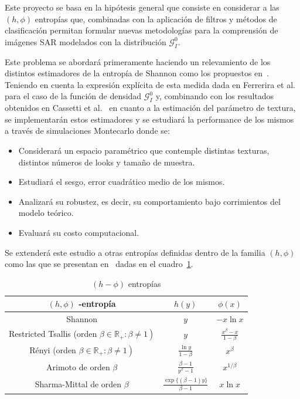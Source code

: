 \documentclass[11pt]{article}
\begin{document}
Este proyecto se basa en la hipótesis general que consiste en considerar a las $(h,\phi)$ entropías que, combinadas con la aplicación de filtros y métodos de clasificación permitan formular nuevas metodologías para la comprensión de imágenes SAR modelados con la distribución $\mathcal{G}_I^0$.

Este problema se abordará primeramente haciendo un relevamiento de los distintos estimadores de la entropía de Shannon como los propuestos en~\cite{Beirlant1997,AlOmari2013,Behmardi2011}. Teniendo en cuenta la expresión explícita de esta medida dada en Ferrerira et al.~\cite{Ferreira2020} para el caso de la función de densidad $\mathcal{G}_I^0$ y, combinando con los resultados obtenidos en Cassetti et al.~\cite{Cassetti2020} en cuanto a la estimación del parámetro de textura, se implementarán estos estimadores y se estudiará la performance de los mismos a través de simulaciones Montecarlo donde se:
\begin{itemize}
	\item Considerará un espacio paramétrico que contemple distintas texturas, distintos números de looks y tamaño de muestra.
	\item Estudiará el sesgo, error cuadrático medio de los mismos.
	\item Analizará su robustez, es decir, su comportamiento bajo corrimientos del modelo teórico. 
	\item Evaluará su costo computacional.
\end{itemize} 

Se extenderá este estudio a otras entropías definidas dentro de la familia $(h,\phi)$ como las que se presentan en~\cite{Frery2019} dadas en el cuadro~\ref{entropia}.


\begin{table}[htb]
	\caption{\label{entropia} $(h-\phi)$ entropías}
	\begin{center}
		\begin{tabular}{ccc} 
			\hline$(h, \phi)$ -entropía & $h(y)$ & $\phi(x)$ \\
			\hline Shannon  & $y$ & $-x \ln x$ \\
			Restricted Tsallis (orden $\left.\beta \in \mathbb{R}_{+}: \beta \neq 1\right)$ & $y$ & $\frac{x^{\beta}-x}{1-\beta}$ \\
			Rényi (orden $\left.\beta \in \mathbb{R}_{+}: \beta \neq 1\right)$ & $\frac{\ln y}{1-\beta}$ & $x^{\beta}$ \\
			Arimoto de orden $\beta$ & $\frac{\beta-1}{y^{\beta}-1}$ & $x^{1 / \beta}$ \\
			Sharma-Mittal de orden $\beta$ & $\frac{\exp \{(\beta-1) y\}}{\beta-1}$ & $x \ln x$ \\
			\hline
		\end{tabular}
	\end{center}
\end{table}
\end{document}

